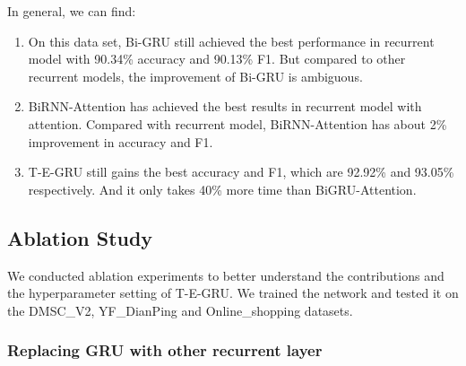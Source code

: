 In general, we can find:
\begin{enumerate}
    \item On this data set, Bi-GRU still achieved the best performance in recurrent model with 90.34\% accuracy and 90.13\% F1. But compared to other recurrent models, the improvement of Bi-GRU is ambiguous.
    \item BiRNN-Attention has achieved the best results in recurrent model with attention. Compared with recurrent model, BiRNN-Attention has about 2\% improvement in accuracy and F1.
    \item T-E-GRU still gains the best accuracy and F1, which are 92.92\% and 93.05\% respectively. And it only takes 40\% more time than BiGRU-Attention.
\end{enumerate}

\subsection{Ablation Study}

We conducted ablation experiments to better understand the contributions and the hyperparameter setting of T-E-GRU. We trained the network and tested it on the DMSC\_V2, YF\_DianPing and Online\_shopping datasets.

\subsubsection{Replacing GRU with other recurrent layer}

